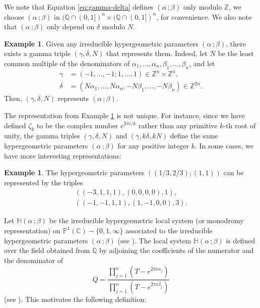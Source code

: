 \documentclass[11pt, reqno]{amsart}
\theoremstyle{plain}
\theoremstyle{definition}
\newtheorem{exa}[theo]{Example}
\newcommand{\Z}{\mathbb{Z}}
\newcommand{\Ps}{\mathbb{P}}
\newcommand{\Q}{\mathbb{Q}}
\newcommand{\C}{\mathbb{C}}
\newcommand{\ga}{\gamma}
\newcommand{\be}{\beta}
\newcommand{\al}{\alpha}
\newcommand{\HH}{\mathbb{H}}
\begin{document}
We note that Equation \eqref{eq:gamma-delta} defines $(\al\, ;\be)$ only modulo $\Z$, we choose $(\al\, ;\be)$ in $(\Q \cap (0,1])^n\times (\Q \cap (0,1])^n$, for convenience. We also note that $(\al \, ; \be)$ only depend on $\delta$ modulo $N$.

\begin{exa}\label{example-1}
Given any irreducible hypergeometric parameters $(\al \,;\be)$, there exists a gamma triple $(\ga,\delta,N)$ that represents them. 
Indeed, let $N$ be the least common multiple of the denominators of $\al_1,\dots,\al_n, \be_1,\dots,\be_n$, and let
\begin{align*}
    \ga&=(-1,\dots,-1;1,\dots,1) \in \Z^{n}\times \Z^n, \\
    \delta&= (N\al_1,\dots,N\al_n,-N\be_1,\dots,-N\be_n) \in \Z^{2n}.
\end{align*}
Then, $(\ga,\delta,N)$ represents $(\al \,;\be)$.
\end{exa}

The representation from Example \ref{example-1} is not unique.  For instance, since we have defined $\zeta_k$ to be the complex number $e^{2\pi i/k}$ rather than any primitive $k$-th root of unity, the gamma triples $(\gamma,\delta,N)$ and $ (\gamma,k \delta,kN)$ define the same hypergeometric parameters $(\al \,;\be)$ for any positive integer $k$. In some cases, we have more interesting representations:

\begin{exa}\label{exa:example-2}
The hypergeometric parameters $((1/3,2/3);(1,1))$ can be represented by the triples
\begin{align*}
    ((-3,1,1,1),(0,0,0,0),1), \\
    ((-1,-1,1,1),(1,-1,0,0),3).
\end{align*}
\end{exa} 
Let $\HH(\al \,;\be)$ be the irreducible hypergeometric local system (or monodromy representation) on $\Ps^1(\C)-\{0,1,\infty\}$ associated to the irreducible hypergeometric parameters $(\al \,;\be)$ (see \cite[Equation~2.14]{Beukers-heckman}). The local system $\HH(\al \,;\be)$ is defined over the field obtained from $\Q$ by adjoining the coefficients of the numerator and the denominator of 
\begin{equation}
    Q= \frac{\prod_{j=1}^n (T- e^{2\pi i \alpha_j})}{\prod_{j=1}^n (T- e^{2\pi i \beta_j}) } \label{eq:quotient-Q}
\end{equation}
(see \cite[Corollary 3.6]{Beukers-heckman}). This motivates the following definition:
\end{document}
